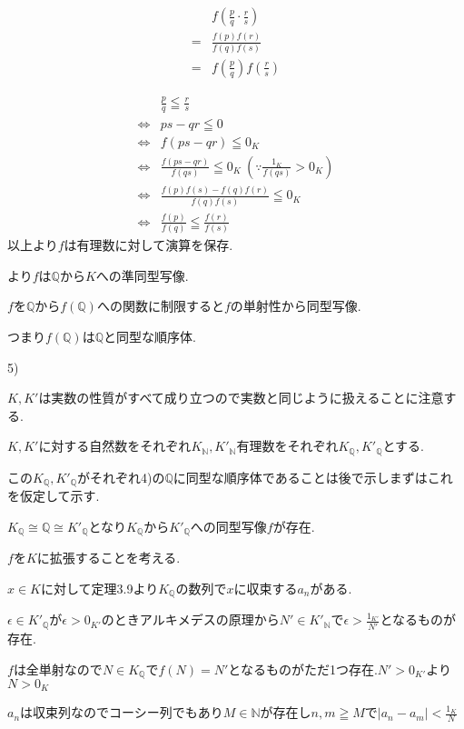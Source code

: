 \documentclass{jsarticle}
\begin{document}
\begin{align*}
&f(\frac{p}{q}\cdot\frac{r}{s})\\
= & \frac{f(p)f(r)}{f(q)f(s)}\\
= & f(\frac{p}{q})f(\frac{r}{s})
\end{align*}

\begin{align*}
&\frac{p}{q}\leqq\frac{r}{s}\\
\Leftrightarrow & ps-qr\leqq0\\
\Leftrightarrow & f(ps-qr)\leqq 0_K\\
\Leftrightarrow & \frac{f(ps-qr)}{f(qs)}\leqq 0_K \ (\because \frac{1_K}{f(qs)}> 0_K)\\
\Leftrightarrow & \frac{f(p)f(s)-f(q)f(r)}{f(q)f(s)}\leqq 0_K\\
\Leftrightarrow & \frac{f(p)}{f(q)}\leqq\frac{f(r)}{f(s)}
\end{align*}
以上より$f$は有理数に対して演算を保存.

より$f$は$\mathbb{Q}$から$K$への準同型写像.

$f$を$\mathbb{Q}$から$f(\mathbb{Q})$への関数に制限すると$f$の単射性から同型写像.

つまり$f(\mathbb{Q})$は$\mathbb{Q}$と同型な順序体.

5)

$K,K'$は実数の性質がすべて成り立つので実数と同じように扱えることに注意する.

$K,K'$に対する自然数をそれぞれ$K_{\mathbb{N}},K'_{\mathbb{N}}$有理数をそれぞれ$K_{\mathbb{Q}},K'_{\mathbb{Q}}$とする.

この$K_{\mathbb{Q}},K'_{\mathbb{Q}}$がそれぞれ4)の$\mathbb{Q}$に同型な順序体であることは後で示しまずはこれを仮定して示す.

$K_{\mathbb{Q}} \cong \mathbb{Q} \cong K'_{\mathbb{Q}}$となり$K_{\mathbb{Q}}$から$K'_{\mathbb{Q}}$への同型写像$f$が存在.

$f$を$K$に拡張することを考える.

$x\in K$に対して定理3.9より$K_{\mathbb{Q}}$の数列で$x$に収束する$a_n$がある.

$\epsilon \in K'_{\mathbb{Q}}$が$\epsilon > 0_{K'}$のときアルキメデスの原理から$N'\in K'_{\mathbb{N}}$で$\epsilon > \frac{1_{K'}}{N'}$となるものが存在.

$f$は全単射なので$N\in K_\mathbb{Q}$で$f(N)=N'$となるものがただ1つ存在.$N' > 0_{K'}$より$N > 0_K$

$a_n$は収束列なのでコーシー列でもあり$M\in\mathbb{N}$が存在し$n,m\geqq M$で$|a_n-a_m|< \frac{1_K}{N}$
\end{document}
